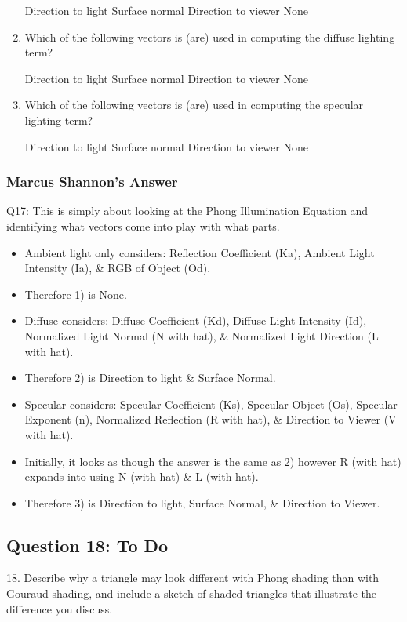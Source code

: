 \documentclass[11pt]{article}
\begin{document}
\begin{spacing}{1.2}
\begin{enumerate}[label=\arabic*)]
	Direction to light \qquad Surface normal \qquad Direction to viewer \qquad None
	\item Which of the following vectors is (are) used in computing the diffuse lighting term?
	
	Direction to light \qquad Surface normal \qquad Direction to viewer \qquad None
	\item Which of the following vectors is (are) used in computing the specular lighting term?
		
	Direction to light \qquad Surface normal \qquad Direction to viewer \qquad None

\end{enumerate}

\subsubsection{Marcus Shannon's Answer}

Q17: This is simply about looking at the Phong Illumination Equation and identifying what vectors come into play with what parts.
\begin{itemize}
    \item Ambient light only considers: Reflection Coefficient (Ka), Ambient Light Intensity (Ia), \& RGB of Object (Od).  
      \item Therefore 1) is None.
    \item Diffuse considers: Diffuse Coefficient (Kd), Diffuse Light Intensity (Id), Normalized Light Normal (N with hat), \& Normalized Light Direction (L with hat).
      \item Therefore 2) is Direction to light \& Surface Normal.
    \item Specular considers: Specular Coefficient (Ks), Specular Object (Os), Specular Exponent (n), Normalized Reflection (R with hat), \& Direction to Viewer (V with hat).
      \item Initially, it looks as though the answer is the same as 2) however R (with hat) expands into using N (with hat) \& L (with hat).
      \item Therefore 3) is Direction to light, Surface Normal, \& Direction to Viewer.
\end{itemize}

\subsection{Question 18: To Do}
18.  Describe why a triangle may look different with Phong shading than with Gouraud shading, and include a sketch of shaded triangles that illustrate the difference you discuss. 


\end{spacing}
\end{document}
